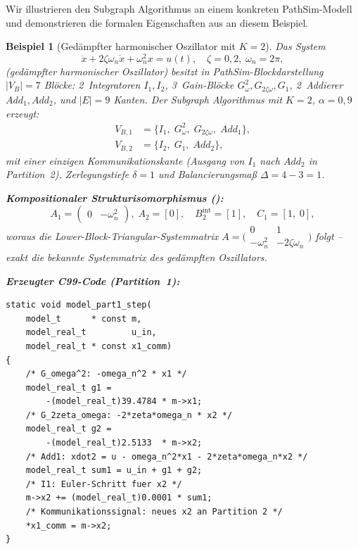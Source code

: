 ﻿\documentclass[12pt,a4paper]{article}
\newtheorem{beispiel}[theorem]{Beispiel}
\theoremstyle{definition}
\begin{document}
Wir illustrieren den Subgraph Algorithmus an einem konkreten PathSim-Modell
und demonstrieren die formalen Eigenschaften aus 
an diesem Beispiel.

\begin{beispiel}[Gedämpfter harmonischer Oszillator mit $K = 2$]
\label{ex:oscillator}
Das System
\[
  \ddot{x} + 2\zeta\omega_n \dot{x} + \omega_n^2 x = u(t),
  \quad \zeta = 0{,}2,\; \omega_n = 2\pi,
\]
(gedämpfter harmonischer Oszillator) besitzt in PathSim-Blockdarstellung
$|V_B| = 7$ Blöcke: 2~Integratoren $I_1, I_2$, 3~Gain-Blöcke
$G_\omega^2, G_{2\zeta\omega}, G_1$, 2~Addierer $\mathit{Add}_1, \mathit{Add}_2$,
und $|E| = 9$ Kanten. Der Subgraph Algorithmus mit $K=2$, $\alpha = 0{,}9$
erzeugt:
\begin{align*}
  V_{B,1} &= \{I_1,\; G_\omega^2,\; G_{2\zeta\omega},\; \mathit{Add}_1\}, \\
  V_{B,2} &= \{I_2,\; G_1,\; \mathit{Add}_2\},
\end{align*}
mit einer einzigen Kommunikationskante (Ausgang von $I_1$ nach
$\mathit{Add}_2$ in Partition~2), Zerlegungstiefe $\delta = 1$
und Balancierungsmaß $\Delta = 4 - 3 = 1$.

\textbf{Kompositionaler Strukturisomorphismus ():}
\[
  A_1 = \begin{pmatrix} 0 & -\omega_n^2 \end{pmatrix},\;
  A_2 = [0],\quad
  B_2^{\mathrm{int}} = [1],\quad
  C_1 = [1,\;0],
\]
woraus die Lower-Block-Triangular-Systemmatrix
$A = \bigl(\begin{smallmatrix}0 & 1 \\ -\omega_n^2 & -2\zeta\omega_n
\end{smallmatrix}\bigr)$ folgt -- exakt die bekannte Systemmatrix des
gedämpften Oszillators.

\textbf{Erzeugter C99-Code (Partition~1):}
\begin{lstlisting}[style=cstyle, caption={Subgraph Algorithmus -- Partie 1: Zustandsableitung}]
static void model_part1_step(
    model_t      * const m,
    model_real_t         u_in,
    model_real_t * const x1_comm)
{
    /* G_omega^2: -omega_n^2 * x1 */
    model_real_t g1 =
        -(model_real_t)39.4784 * m->x1;
    /* G_2zeta_omega: -2*zeta*omega_n * x2 */
    model_real_t g2 =
        -(model_real_t)2.5133  * m->x2;
    /* Add1: xdot2 = u - omega_n^2*x1 - 2*zeta*omega_n*x2 */
    model_real_t sum1 = u_in + g1 + g2;
    /* I1: Euler-Schritt fuer x2 */
    m->x2 += (model_real_t)0.0001 * sum1;
    /* Kommunikationssignal: neues x2 an Partition 2 */
    *x1_comm = m->x2;
}
\end{lstlisting}


\end{beispiel}
\end{document}
